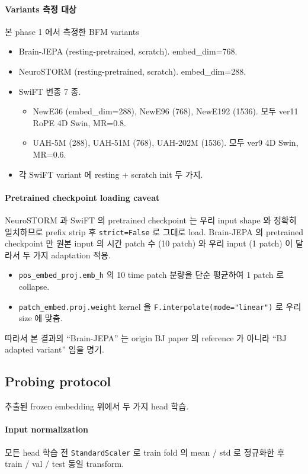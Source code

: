 \documentclass[a4paper,11pt]{article}
\begin{document}
\paragraph{Variants 측정 대상} 본 phase 1 에서 측정한 BFM variants
\begin{itemize}[leftmargin=*, itemsep=2pt]
  \item Brain-JEPA (resting-pretrained, scratch). embed\_dim=768.
  \item NeuroSTORM (resting-pretrained, scratch). embed\_dim=288.
  \item SwiFT 변종 7 종.
    \begin{itemize}
      \item NewE36 (embed\_dim=288), NewE96 (768), NewE192 (1536). 모두 ver11 RoPE 4D Swin, MR=0.8.
      \item UAH-5M (288), UAH-51M (768), UAH-202M (1536). 모두 ver9 4D Swin, MR=0.6.
    \end{itemize}
  \item 각 SwiFT variant 에 resting + scratch init 두 가지.
\end{itemize}

\paragraph{Pretrained checkpoint loading caveat} NeuroSTORM 과 SwiFT 의 pretrained checkpoint 는
우리 input shape 와 정확히 일치하므로 prefix strip 후 \texttt{strict=False} 로 그대로 load.
Brain-JEPA 의 pretrained checkpoint 만 원본 input 의 시간 patch 수 (10 patch) 와
우리 input (1 patch) 이 달라서 두 가지 adaptation 적용.
\begin{itemize}[leftmargin=*, itemsep=2pt]
  \item \texttt{pos\_embed\_proj.emb\_h} 의 10 time patch 분량을 단순 평균하여 1 patch 로 collapse.
  \item \texttt{patch\_embed.proj.weight} kernel 을 \texttt{F.interpolate(mode="linear")} 로 우리 size 에 맞춤.
\end{itemize}
따라서 본 결과의 ``Brain-JEPA'' 는 origin BJ paper 의 reference 가 아니라 ``BJ adapted variant'' 임을 명기.

\subsection{Probing protocol}

추출된 frozen embedding 위에서 두 가지 head 학습.

\paragraph{Input normalization} 모든 head 학습 전 \texttt{StandardScaler} 로 train fold 의 mean / std 로 정규화한 후 train / val / test 동일 transform.
\end{document}
